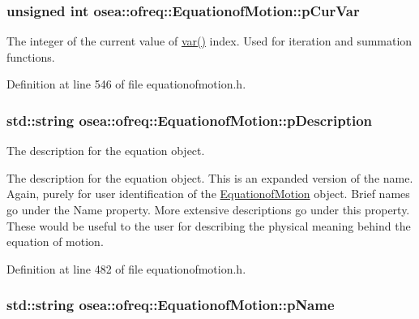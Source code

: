\hypertarget{classosea_1_1ofreq_1_1_equationof_motion_a88a53c5688c07a1cb90cdf5755782fcf}{
\subsubsection[{p\-Cur\-Var}]{\setlength{\rightskip}{0pt plus 5cm}unsigned int osea\-::ofreq\-::\-Equationof\-Motion\-::p\-Cur\-Var\hspace{0.3cm}{\ttfamily [protected]}}}\label{classosea_1_1ofreq_1_1_equationof_motion_a88a53c5688c07a1cb90cdf5755782fcf}


The integer of the current value of \hyperlink{classosea_1_1ofreq_1_1_equationof_motion_ab69511cc5037376cf7da80ce30d9eaab}{var()} index. Used for iteration and summation functions. 



Definition at line 546 of file equationofmotion.\-h.

\hypertarget{classosea_1_1ofreq_1_1_equationof_motion_aa6ce10dacd47441d445a9170bd355792}{
\subsubsection[{p\-Description}]{\setlength{\rightskip}{0pt plus 5cm}std\-::string osea\-::ofreq\-::\-Equationof\-Motion\-::p\-Description\hspace{0.3cm}{\ttfamily [protected]}}}\label{classosea_1_1ofreq_1_1_equationof_motion_aa6ce10dacd47441d445a9170bd355792}


The description for the equation object. 

The description for the equation object. This is an expanded version of the name. Again, purely for user identification of the \hyperlink{classosea_1_1ofreq_1_1_equationof_motion}{Equationof\-Motion} object. Brief names go under the Name property. More extensive descriptions go under this property. These would be useful to the user for describing the physical meaning behind the equation of motion. 

Definition at line 482 of file equationofmotion.\-h.

\hypertarget{classosea_1_1ofreq_1_1_equationof_motion_a5848a1ad14d31556fd1b62b4e3de3643}{
\subsubsection[{p\-Name}]{\setlength{\rightskip}{0pt plus 5cm}std\-::string osea\-::ofreq\-::\-Equationof\-Motion\-::p\-Name\hspace{0.3cm}{\ttfamily [protected]}}}\label{classosea_1_1ofreq_1_1_equationof_motion_a5848a1ad14d31556fd1b62b4e3de3643}


